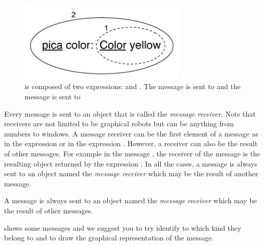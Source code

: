 \begin{figure}[!h]
\centerline{\includegraphics[width=8cm]{ukeyUnOne}} 
\caption{ is composed of two expressions:  and . The message  is sent to  and the message  is sent to \ct{\caro}\label{fig:ellipse}}
\end{figure}


Every message is sent to an object that is called the    \textit{message receiver}. Note that receivers are not limited to be graphical robots but can be anything from numbers to windows. 
A message receiver can be the first element of a message as \ct{\caro} in the expression  or  in the expression . However, a receiver can also be the result of other messages. For example in the message , the receiver of the message  is the resulting object returned by the expression . In all the cases, a message is always sent to an object named the \emph{message receiver} which may be the result of another message. 

\begin{largecadre}{A message is always sent to an object named the \emph{message receiver} which may be the result of other messages.}\end{largecadre}

  
  shows some messages and we suggest you to try identify to which kind they belong to and to draw the graphical representation of the message. 
 
